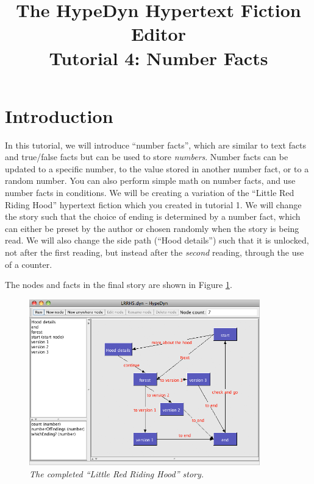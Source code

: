 \documentclass{article}
\begin{document}
\title{The HypeDyn Hypertext Fiction Editor\\Tutorial 4: Number Facts}
\date{}

\onecolumn
\maketitle

\tableofcontents

\section{Introduction}
In this tutorial, we will introduce ``number facts'', which are similar to text
facts and true\slash false facts but can be used to store \textit{numbers}.
Number facts can be updated to a specific number, to the value stored in another
number fact, or to a random number. You can also perform simple math on number
facts, and use number facts in conditions. We will be creating a variation of
the ``Little Red Riding Hood'' hypertext fiction which you created in tutorial
1. We will change the story such that the choice of ending is determined by a
number fact, which can either be preset by the author or chosen randomly when
the story is being read. We will also change the side path (``Hood details'')
such that it is unlocked, not after the first reading, but instead after the
\textit{second} reading, through the use of a counter.


The nodes and facts in the final story are shown in Figure
\ref{fig:tut3:completed}.

\begin{figure}[h]
  \centering
  \includegraphics[width=10cm]{images/hypedyn-tutorial-3-figure-1}
  \caption{\textit{The completed ``Little Red Riding Hood'' story.}}
  \label{fig:tut3:completed}
\end{figure} 
\end{document}
